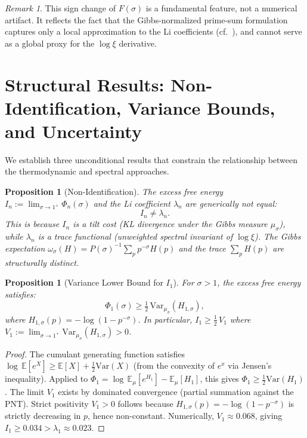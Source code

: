 \documentclass[12pt,a4paper]{article}
\newtheorem{proposition}[theorem]{Proposition}
\theoremstyle{definition}
\theoremstyle{remark}
\newtheorem{remark}[theorem]{Remark}
\begin{document}
\begin{remark}
This sign change of $F(\sigma)$ is a fundamental feature, not a numerical artifact. It reflects the fact that the Gibbs-normalized prime-sum formulation captures only a local approximation to the Li coefficients (cf.\ ), and cannot serve as a global proxy for the $\log\xi$ derivative.
\end{remark}

\section{Structural Results: Non-Identification, Variance Bounds, and Uncertainty}

We establish three unconditional results that constrain the relationship between the thermodynamic and spectral approaches.

\begin{proposition}[Non-Identification]\label{prop:non-ident}
The excess free energy $I_n := \lim_{\sigma \to 1^+} \Phi_n(\sigma)$ and the Li coefficient $\lambda_n$ are generically \emph{not} equal:
\[ I_n \neq \lambda_n. \]
This is because $I_n$ is a \emph{tilt cost} (KL divergence under the Gibbs measure $\mu_\sigma$), while $\lambda_n$ is a \emph{trace functional} (unweighted spectral invariant of $\log\xi$). The Gibbs expectation $\omega_\sigma(H) = P(\sigma)^{-1}\sum_p p^{-\sigma}H(p)$ and the trace $\sum_p H(p)$ are structurally distinct.
\end{proposition}

\begin{proposition}[Variance Lower Bound for $I_1$]\label{prop:variance-bound}
For $\sigma > 1$, the excess free energy satisfies:
\[ \Phi_1(\sigma) \geq \tfrac{1}{2}\,\mathrm{Var}_{\mu_\sigma}(H_{1,\sigma}), \]
where $H_{1,\sigma}(p) = -\log(1 - p^{-\sigma})$. In particular, $I_1 \geq \tfrac{1}{2}\,V_1$ where $V_1 := \lim_{\sigma \to 1^+}\mathrm{Var}_{\mu_\sigma}(H_{1,\sigma}) > 0$.
\end{proposition}
\begin{proof}
The cumulant generating function satisfies $\log\,\mathbb{E}[e^X] \geq \mathbb{E}[X] + \frac{1}{2}\mathrm{Var}(X)$ (from the convexity of $e^x$ via Jensen's inequality). Applied to $\Phi_1 = \log\,\mathbb{E}_{\mu}[e^{H_1}] - \mathbb{E}_{\mu}[H_1]$, this gives $\Phi_1 \geq \frac{1}{2}\mathrm{Var}(H_1)$. The limit $V_1$ exists by dominated convergence (partial summation against the PNT). Strict positivity $V_1 > 0$ follows because $H_{1,\sigma}(p) = -\log(1-p^{-\sigma})$ is strictly decreasing in $p$, hence non-constant. Numerically, $V_1 \approx 0.068$, giving $I_1 \geq 0.034 > \lambda_1 \approx 0.023$.
\end{proof}
\end{document}
